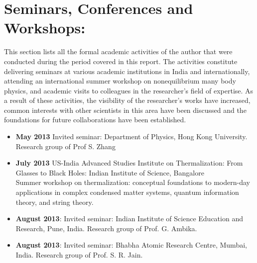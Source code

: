 \documentclass[a4paper,10pt]{report}
\begin{document}
\section{\sc Seminars, Conferences and Workshops:}
This section lists all the formal academic activities of the author that were conducted during the period covered in this report. The activities constitute delivering seminars at various academic institutions in India and internationally, attending an international summer workshop on nonequilibrium many body physics, and academic visits to colleagues in the researcher's field of expertise. As a result of these activities, the visibility of the researcher's works have increased, common interests with other scientists in this area have been discussed and the foundations for future collaborations have been established.
 
\begin{itemize}
\item 
{\bf May 2013} Invited seminar: Department of Physics, Hong Kong University. Research group of Prof S. Zhang
\item 
{\bf July 2013} US-India Advanced Studies Institute on Thermalization: From Glasses to Black Holes: {Indian Institute of Science, Bangalore}\\
Summer workshop on thermalization: conceptual foundations to modern-day applications in complex condensed matter systems, quantum information theory, and string theory.
\item
{\bf August 2013}: Invited seminar: Indian Institute of Science Education and Research, Pune, India. Research group of Prof. G. Ambika.
\item
{\bf August 2013}: Invited seminar: Bhabha Atomic Research Centre, Mumbai, India. Research group of Prof. S. R. Jain. 
\end{itemize}
\end{document}

